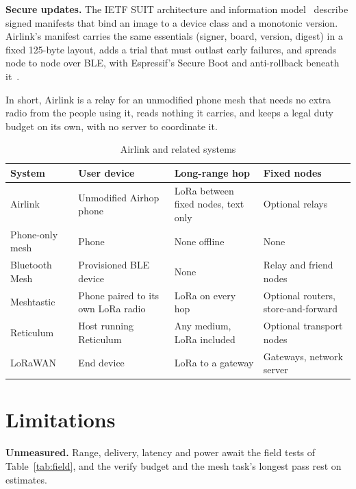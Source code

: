 \documentclass[conference]{IEEEtran}
\begin{document}
\textbf{Secure updates.} The IETF SUIT architecture and information model~\cite{rfc9019,rfc9124} describe signed manifests that bind an image to a device class and a monotonic version. Airlink's manifest carries the same essentials (signer, board, version, digest) in a fixed 125-byte layout, adds a trial that must outlast early failures, and spreads node to node over BLE, with Espressif's Secure Boot and anti-rollback beneath it~\cite{espidf_secureboot,espidf_ota}.

In short, Airlink is a relay for an unmodified phone mesh that needs no extra radio from the people using it, reads nothing it carries, and keeps a legal duty budget on its own, with no server to coordinate it.

\begin{table}[t]
\caption{Airlink and related systems}
\label{tab:compare}
\centering
\scriptsize
\begin{tabular}{@{}L{1.6cm}L{2.1cm}L{1.9cm}L{1.75cm}@{}}
\toprule
System & User device & Long-range hop & Fixed nodes \\
\midrule
Airlink & Unmodified Airhop phone & LoRa between fixed nodes, text only & Optional relays \\
Phone-only mesh & Phone & None offline & None \\
Bluetooth Mesh~\cite{btmesh} & Provisioned BLE device & None & Relay and friend nodes \\
Meshtastic~\cite{meshtasticintro} & Phone paired to its own LoRa radio & LoRa on every hop & Optional routers, store-and-forward \\
Reticulum~\cite{reticulum} & Host running Reticulum & Any medium, LoRa included & Optional transport nodes \\
LoRaWAN~\cite{lorawan} & End device & LoRa to a gateway & Gateways, network server \\
\bottomrule
\end{tabular}
\end{table}

\section{Limitations}
\label{sec:limits}

\textbf{Unmeasured.} Range, delivery, latency and power await the field tests of Table~\ref{tab:field}, and the verify budget and the mesh task's longest pass rest on estimates.
\end{document}
